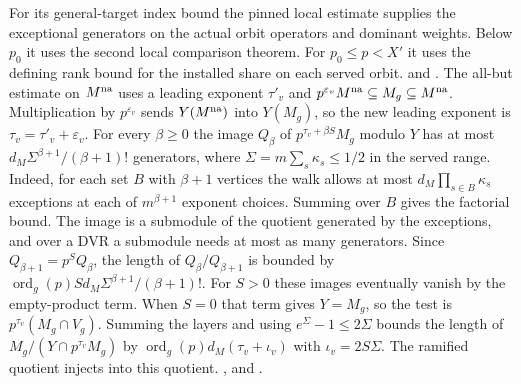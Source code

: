For its general-target index bound the pinned local estimate supplies
the exceptional generators on the actual orbit operators and dominant
weights. Below \(p_0\) it uses the second local comparison theorem.
For \(p_0\le p<X'\) it uses the defining rank bound for the
installed share on each served orbit.
 and
.
The all-but estimate on \(M^{\rm na}\) uses a leading exponent
\(\tau'_v\) and
\(p^{\varepsilon_v}M^{\rm na}\subseteq M_g\subseteq M^{\rm na}\).
Multiplication by \(p^{\varepsilon_v}\) sends
\(Y(M^{\rm na})\) into \(Y(M_g)\), so the new leading exponent is
\(\tau_v=\tau'_v+\varepsilon_v\). For every \(\beta\ge0\) the
image \(Q_\beta\) of \(p^{\tau_v+\beta S}M_g\) modulo \(Y\)
has at most \(d_M\Sigma^{\beta+1}/(\beta+1)!\) generators,
where \(\Sigma=m\sum_s\kappa_s\le1/2\) in the served range.
Indeed, for each set \(B\) with \(\beta+1\) vertices the walk
allows at most \(d_M\prod_{s\in B}\kappa_s\) exceptions at each
of \(m^{\beta+1}\) exponent choices. Summing over \(B\) gives
the factorial bound. The image is a submodule of the quotient
generated by the exceptions, and over a DVR a submodule needs
at most as many generators. Since \(Q_{\beta+1}=p^S Q_\beta\),
the length of \(Q_\beta/Q_{\beta+1}\) is bounded by
\(\operatorname{ord}_g(p)S d_M\Sigma^{\beta+1}/(\beta+1)!\).
For \(S>0\) these images eventually vanish by the empty-product
term. When \(S=0\) that term gives \(Y=M_g\), so the test is
\(p^{\tau_v}(M_g\cap V_g)\). Summing the layers and using
\(e^\Sigma-1\le2\Sigma\) bounds the length of
\(M_g/(Y\cap p^{\tau_v}M_g)\) by
\(\operatorname{ord}_g(p)d_M(\tau_v+\iota_v)\) with
\(\iota_v=2S\Sigma\). The ramified quotient injects into this
quotient.
,
 and
.

